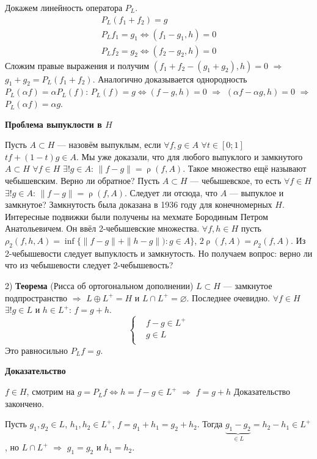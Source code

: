\documentclass[12pt]{article}
\DeclareMathOperator{\rh}{\rho}
\begin{document}
Докажем линейность оператора $P_L$.
\begin{gather*}
P_L(f_1 + f_2) = g\\
P_Lf_1 = g_1 \Leftrightarrow (f_1 - g_1, h) = 0\\
P_Lf_2 = g_2 \Leftrightarrow (f_2 - g_2, h) = 0
\end{gather*}
Сложим правые выражения и получим $(f_1 + f_2 - (g_1 + g_2), h) = 0$ $\Rightarrow$ $g_1 + g_2 = P_L(f_1 + f_2)$.
Аналогично доказывается однородность $P_L(\alpha f) = \alpha P_L(f)$: $P_L(f) = g \Leftrightarrow (f - g, h) = 0$ $\Rightarrow$
$(\alpha f - \alpha g, h) = 0$ $\Rightarrow$ $P_L(\alpha f) = \alpha g$.

\textbf{Проблема выпуклости в $H$}

Пусть $A \subset H$ --- назовём выпуклым, если $\forall f,g \in A$ $\forall t \in [0;1]$ $t f + (1 - t) g \in A$.
Мы уже доказали, что для любого выпуклого и замкнутого $A \subset H$ $\forall f \in H$ $\exists! g \in A$: $\|f - g\| = \rh(f, A)$.
Такое множество ещё называют чебышевским.
Верно ли обратное? Пусть $A \subset H$ --- чебышевское, то есть $\forall f \in H$ $\exists! g \in A$: $\|f - g\| = \rh(f,A)$. 
Следует ли отсюда, что $A$ --- выпуклое и замкнутое?
Замкнутость была доказана в 1936 году для конечномерных $H$.
Интересные подвижки были получены на мехмате Бородиным Петром Анатольевичем.
Он ввёл 2-чебышевские множества.
$\forall f,h \in H$ пусть $\rho_2(f, h, A) = \inf\{\|f - g\| + \|h - g\|):g \in A\}$, $2\rh(f, A) = \rho_2(f, A)$.
Из 2-чебышевости следует выпуклость и замкнутость.
Но получаем вопрос: верно ли что из чебышевости следует 2-чебышевость?

2) \textbf{Теорема} (Рисса об ортогональном дополнении)
$L \subset H$ --- замкнутое подпространство $\Rightarrow$ $L \oplus L^+ = H$ и $L \cap L^+ = \varnothing$.
Последнее очевидно. 
$\forall f \in H$ $\exists! g \in L$ и $h \in L^+$: $f = g + h$.
$$
\left\{
\begin{aligned}
&f - g \in L^{+}\\
&g \in L\\
\end{aligned}
\right.
$$
Это равносильно $P_Lf = g$.

\textbf{Доказательство}

$f \in H$, смотрим на $g = P_Lf \Leftrightarrow h = f - g \in L^+$ $\Rightarrow$ $f = g + h$ Доказательство закончено.

Пусть $g_1,g_2 \in L$, $h_1, h_2 \in L^+$,  $f = g_1 + h_1 = g_2 + h_2$.
Тогда $\underbrace{g_1 - g_2}_{\in L} = h_2 - h_1 \in L^+$, но $L \cap L^+$ $\Rightarrow$ $g_1 = g_2$ и $h_1 = h_2$.
\end{document}
